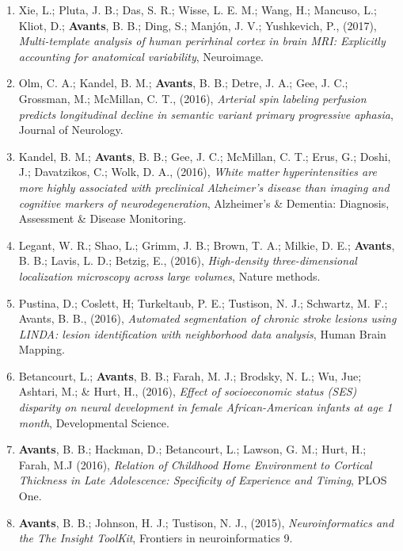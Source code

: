 \documentclass[11pt]{moderncv} %
\begin{document}
\begin{enumerate}
\item Xie, L.; Pluta, J. B.; Das, S. R.; Wisse, L. E. M.; Wang, H.; Mancuso, L.; Kliot, D.; \textbf{Avants}, B. B.; Ding, S.; Manj{\'o}n, J. V.; Yushkevich, P., (2017), \textit{Multi-template analysis of human perirhinal cortex in brain MRI: Explicitly accounting for anatomical variability}, Neuroimage.

\item Olm, C. A.; Kandel, B. M.; \textbf{Avants}, B. B.; Detre, J. A.; Gee, J. C.; Grossman, M.; McMillan, C. T., (2016), \textit{Arterial spin labeling perfusion predicts longitudinal decline in semantic variant primary progressive aphasia}, Journal of Neurology.

\item Kandel, B. M.; \textbf{Avants}, B. B.; Gee, J. C.; McMillan, C. T.; Erus, G.; Doshi, J.; Davatzikos, C.; Wolk, D. A., (2016), \textit{White matter hyperintensities are more highly associated with preclinical Alzheimer's disease than imaging and cognitive markers of neurodegeneration}, Alzheimer's \& Dementia: Diagnosis, Assessment \& Disease Monitoring.

\item Legant, W. R.; Shao, L.; Grimm, J. B.; Brown, T. A.; Milkie, D. E.; \textbf{Avants}, B. B.; Lavis, L. D.; Betzig, E., (2016), \textit{High-density three-dimensional localization microscopy across large volumes}, Nature methods.

\item Pustina, D.; Coslett, H; Turkeltaub, P. E.; Tustison, N. J.; Schwartz, M. F.; Avants, B. B., (2016), \textit{Automated segmentation of chronic stroke lesions using LINDA: lesion identification with neighborhood data analysis}, Human Brain Mapping.

\item Betancourt, L.; \textbf{Avants}, B. B.; Farah, M. J.; Brodsky, N. L.; Wu, Jue;  Ashtari, M.; \& Hurt, H., (2016), \textit{Effect of socioeconomic status (SES) disparity on neural development in female African-American infants at age 1 month}, Developmental Science.

\item \textbf{Avants}, B. B.; Hackman, D.; Betancourt, L.; Lawson, G. M.; Hurt, H.; Farah, M.J (2016), \textit{Relation of Childhood Home Environment to Cortical Thickness in Late Adolescence: Specificity of Experience and Timing}, PLOS One.

\item  \textbf{Avants}, B. B.; Johnson, H. J.; Tustison, N. J., (2015), \textit{Neuroinformatics and the The Insight ToolKit}, Frontiers in neuroinformatics 9.


\end{enumerate}
\end{document}
